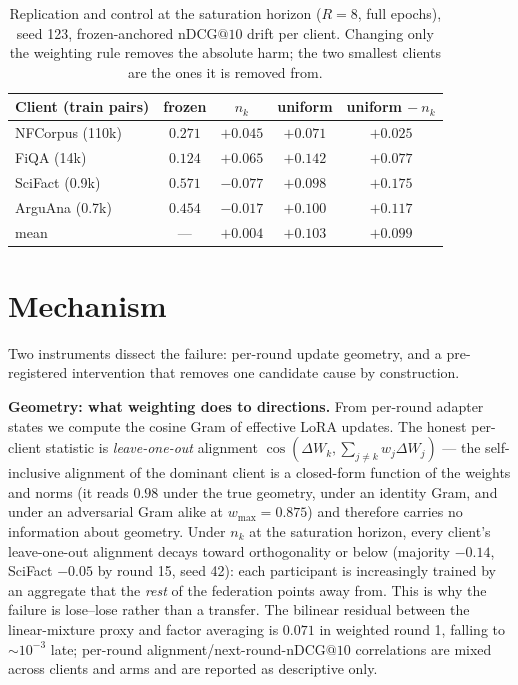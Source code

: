 \documentclass[sigconf,anonymous,review]{acmart}
\makeatletter
\newcommand{\ndcg}{\mathrm{nDCG@10}}
\makeatother
\begin{document}
\begin{table}[t]
\caption{Replication and control at the saturation horizon ($R{=}8$, full epochs), seed 123, frozen-anchored $\ndcg$ drift per client. Changing only the weighting rule removes the absolute harm; the two smallest clients are the ones it is removed from.}
\label{tab:e1}
\begin{tabular}{lcccc}
\toprule
Client (train pairs) & frozen & $n_k$ & uniform & uniform $-\ n_k$\\
\midrule
NFCorpus (110k) & $0.271$ & $+0.045$ & $+0.071$ & $+0.025$\\
FiQA (14k) & $0.124$ & $+0.065$ & $+0.142$ & $+0.077$\\
SciFact (0.9k) & $0.571$ & $\mathbf{-0.077}$ & $+0.098$ & $+0.175$\\
ArguAna (0.7k) & $0.454$ & $\mathbf{-0.017}$ & $+0.100$ & $+0.117$\\
\midrule
mean & --- & $+0.004$ & $+0.103$ & $+0.099$\\
\bottomrule
\end{tabular}
\end{table}

\section{Mechanism}\label{sec:mechanism}
Two instruments dissect the failure: per-round update geometry, and a pre-registered intervention that removes one candidate cause by construction.

\textbf{Geometry: what weighting does to directions.} From per-round adapter states we compute the cosine Gram of effective LoRA updates. The honest per-client statistic is \emph{leave-one-out} alignment $\cos(\Delta W_k, \sum_{j\neq k} w_j \Delta W_j)$ --- the self-inclusive alignment of the dominant client is a closed-form function of the weights and norms (it reads $0.98$ under the true geometry, under an identity Gram, and under an adversarial Gram alike at $w_{\max}=0.875$) and therefore carries no information about geometry. Under $n_k$ at the saturation horizon, every client's leave-one-out alignment decays toward orthogonality or below (majority $-0.14$, SciFact $-0.05$ by round 15, seed 42): each participant is increasingly trained by an aggregate that the \emph{rest} of the federation points away from. This is why the failure is lose--lose rather than a transfer. The bilinear residual between the linear-mixture proxy and factor averaging is $0.071$ in weighted round 1, falling to $\sim 10^{-3}$ late; per-round alignment/next-round-$\ndcg$ correlations are mixed across clients and arms and are reported as descriptive only.
\end{document}
